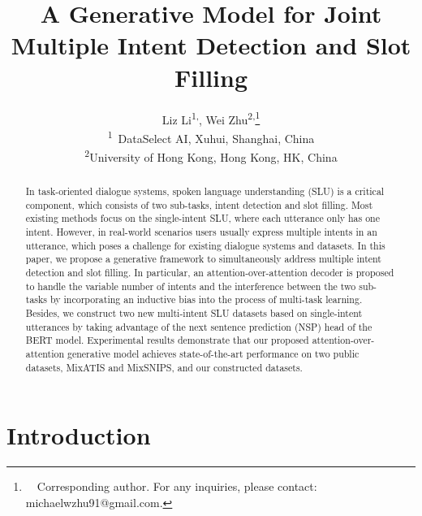 \documentclass[11pt]{article}
\title{A Generative Model for Joint Multiple Intent Detection and Slot Filling }
\author{
    Liz Li\textsuperscript{1,}, Wei Zhu\textsuperscript{2,}\thanks{\ \ Corresponding author. For any inquiries, please contact: michaelwzhu91@gmail.com. }\\
    \small \textsuperscript{1}\ DataSelect AI, Xuhui, Shanghai, China \\
    \small \textsuperscript{2}University of Hong Kong, Hong Kong, HK, China
}
\begin{document}
\maketitle
\begin{abstract}
In task-oriented dialogue systems, spoken language understanding (SLU) is a critical component, which consists of two sub-tasks, intent detection and slot filling.
Most existing methods focus on the single-intent SLU, where each utterance only has one intent.
However, in real-world scenarios users usually express multiple intents in an utterance, which poses a challenge for existing dialogue systems and datasets.
In this paper, we propose a generative framework to simultaneously address multiple intent detection and slot filling.
In particular, an attention-over-attention decoder is proposed to handle the variable number of intents and the interference between the two sub-tasks by incorporating an inductive bias into the process of multi-task learning.
Besides, we construct two new multi-intent SLU datasets based on single-intent utterances by taking advantage of the next sentence prediction (NSP) head of the BERT model.
Experimental results demonstrate that our proposed attention-over-attention generative model achieves state-of-the-art performance on two public datasets, MixATIS and MixSNIPS, and our constructed datasets.

\end{abstract}



\section{Introduction}
\label{sec:introduction}
\end{document}
